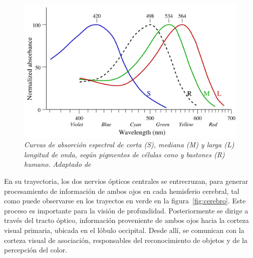 \begin{figure}[htc]
  \centering
  \includegraphics[scale=.3]{images/cono}
  \caption{\em Curvas de absorción espectral de corta (S), mediana (M) y larga (L) longitud de onda, según pigmentos de células cono y bastones (R) humano. Adaptado de \cite{Bowmaker1980}}  
  \label{fig:cono}
\end{figure}

En su trayectoria, los dos nervios ópticos centrales se entrecruzan, para generar procesamiento de información de ambos ojos en cada hemisferio cerebral, tal como puede observarse en los trayectos en verde en la figura~\ref{fig:cerebro}. Este proceso es importante para la visión de profundidad. Posteriormente se dirige a través del tracto óptico, información proveniente de ambos ojos hacia la corteza visual primaria, ubicada en el lóbulo occipital. Desde allí, se comunican con la corteza visual de asociación, responsables del reconocimiento de objetos y de la percepción del color.

